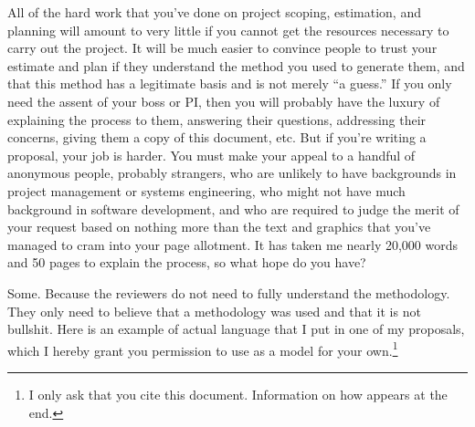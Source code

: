\documentclass[12pt,oneside]{book}
\begin{document}
All of the hard work that you've done on project scoping, estimation, and planning will amount to very little if you cannot get the resources necessary to carry out the project. It will be much easier to convince people to trust your estimate and plan if they understand the method you used to generate them, and that this method has a legitimate basis and is not merely ``a guess.'' If you only need the assent of your boss or PI, then you will probably have the luxury of explaining the process to them, answering their questions, addressing their concerns, giving them a copy of this document, etc. But if you're writing a proposal, your job is harder. You must make your appeal to a handful of anonymous people, probably strangers, who are unlikely to have backgrounds in project management or systems engineering, who might not have much background in software development, and who are required to judge the merit of your request based on nothing more than the text and graphics that you've managed to cram into your page allotment. It has taken me nearly 20,000 words and 50 pages to explain the process, so what hope do you have?

Some. Because the reviewers do not need to fully understand the methodology. They only need to believe that a methodology was used and that it is not bullshit. Here is an example of actual language that I put in one of my proposals, which I hereby grant you permission to use as a model for your own.\footnote{I only ask that you cite this document. Information on how appears at the end.}
\end{document}
